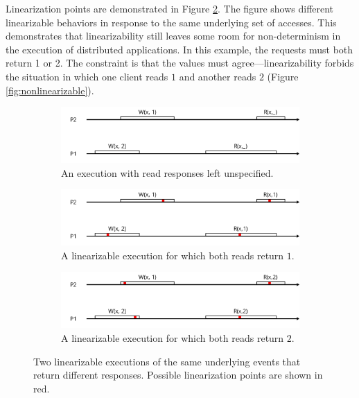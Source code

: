 \documentclass[]             %
{NASA}                       %
\theoremstyle{definition}
\begin{document}
Linearization points are demonstrated in Figure \ref{fig:linearization}.
The figure shows different linearizable behaviors in response to the
same underlying set of accesses. This demonstrates that linearizability
still leaves some room for non-determinism in the execution of
distributed applications. In this example, the requests must both return
1 or 2. The constraint is that the values must agree---linearizability
forbids the situation in which one client reads \(1\) and another reads
\(2\) (Figure \ref{fig:nonlinearizable}).

\begin{figure}
     \begin{subfigure}[a]{1\textwidth}
         \center
         \includegraphics[scale=0.4]{images/linearTemplate.png}
         \caption{An execution with read responses left unspecified.}
         \label{fig:nonlinear}
     \end{subfigure}
     \begin{subfigure}[b]{1\textwidth}
         \center
         \includegraphics[scale=0.4]{images/linear3.png}
         \caption{A linearizable execution for which both reads return $1$.}
     \end{subfigure}
     \begin{subfigure}[c]{1\textwidth}
         \center
         \includegraphics[scale=0.4]{images/linear2.png}
         \caption{A linearizable execution for which both reads return $2$.}
     \end{subfigure}
  \caption{Two linearizable executions of the same underlying events that return different responses. Possible linearization points are shown in red.}
  \label{fig:linearization}
\end{figure}
\end{document}
